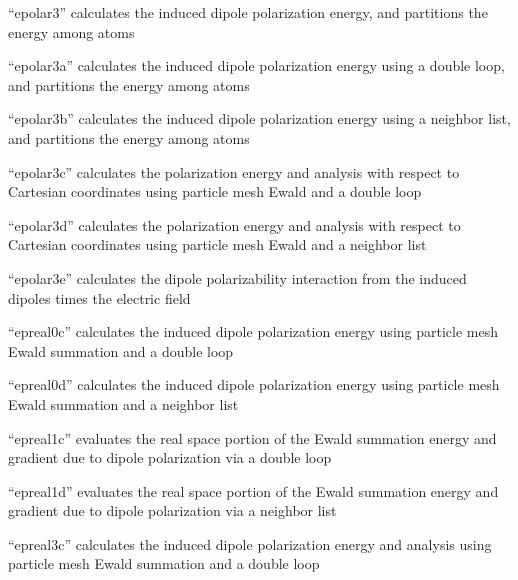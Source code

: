 \documentclass[letterpaper,11pt,english]{sphinxmanual}
\begin{document}

“epolar3” calculates the induced dipole polarization energy,
and partitions the energy among atoms


“epolar3a” calculates the induced dipole polarization energy
using a double loop, and partitions the energy among atoms


“epolar3b” calculates the induced dipole polarization energy
using a neighbor list, and partitions the energy among atoms


“epolar3c” calculates the polarization energy and analysis with
respect to Cartesian coordinates using particle mesh Ewald and
a double loop


“epolar3d” calculates the polarization energy and analysis with
respect to Cartesian coordinates using particle mesh Ewald and
a neighbor list


“epolar3e” calculates the dipole polarizability interaction
from the induced dipoles times the electric field


“epreal0c” calculates the induced dipole polarization energy
using particle mesh Ewald summation and a double loop


“epreal0d” calculates the induced dipole polarization energy
using particle mesh Ewald summation and a neighbor list


“epreal1c” evaluates the real space portion of the Ewald
summation energy and gradient due to dipole polarization
via a double loop


“epreal1d” evaluates the real space portion of the Ewald
summation energy and gradient due to dipole polarization
via a neighbor list


“epreal3c” calculates the induced dipole polarization energy and
analysis using particle mesh Ewald summation and a double loop
\end{document}

